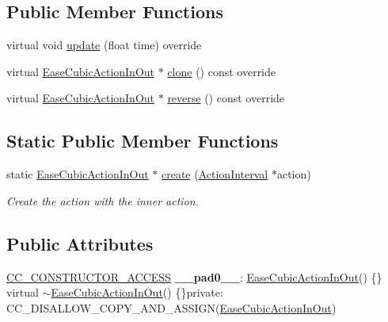 \subsection*{Public Member Functions}
\begin{DoxyCompactItemize}
\item 
virtual void \hyperlink{classEaseCubicActionInOut_a533edabe94657e779ad4e4c6d6d1782f}{update} (float time) override
\item 
virtual \hyperlink{classEaseCubicActionInOut}{Ease\+Cubic\+Action\+In\+Out} $\ast$ \hyperlink{classEaseCubicActionInOut_a763cbeffe3a66602e1524b5ec68341ad}{clone} () const override
\item 
virtual \hyperlink{classEaseCubicActionInOut}{Ease\+Cubic\+Action\+In\+Out} $\ast$ \hyperlink{classEaseCubicActionInOut_a3a63b33ec9a062bd76116f17dd2eb8b4}{reverse} () const override
\end{DoxyCompactItemize}
\subsection*{Static Public Member Functions}
\begin{DoxyCompactItemize}
\item 
static \hyperlink{classEaseCubicActionInOut}{Ease\+Cubic\+Action\+In\+Out} $\ast$ \hyperlink{classEaseCubicActionInOut_a5069b705bf5fc3a58e37726e7202db02}{create} (\hyperlink{classActionInterval}{Action\+Interval} $\ast$action)
\begin{DoxyCompactList}\small\item\em Create the action with the inner action. \end{DoxyCompactList}\end{DoxyCompactItemize}
\subsection*{Public Attributes}
\begin{DoxyCompactItemize}
\item 
\mbox{\label{classEaseCubicActionInOut_a4d282f4ddc96838bc38d6a5f699642e0}} 
\hyperlink{_2cocos2d_2cocos_2base_2ccConfig_8h_a25ef1314f97c35a2ed3d029b0ead6da0}{C\+C\+\_\+\+C\+O\+N\+S\+T\+R\+U\+C\+T\+O\+R\+\_\+\+A\+C\+C\+E\+SS} {\bfseries \+\_\+\+\_\+pad0\+\_\+\+\_\+}\+: \hyperlink{classEaseCubicActionInOut}{Ease\+Cubic\+Action\+In\+Out}() \{\} virtual $\sim$\hyperlink{classEaseCubicActionInOut}{Ease\+Cubic\+Action\+In\+Out}() \{\}private\+: C\+C\+\_\+\+D\+I\+S\+A\+L\+L\+O\+W\+\_\+\+C\+O\+P\+Y\+\_\+\+A\+N\+D\+\_\+\+A\+S\+S\+I\+GN(\hyperlink{classEaseCubicActionInOut}{Ease\+Cubic\+Action\+In\+Out})
\end{DoxyCompactItemize}
